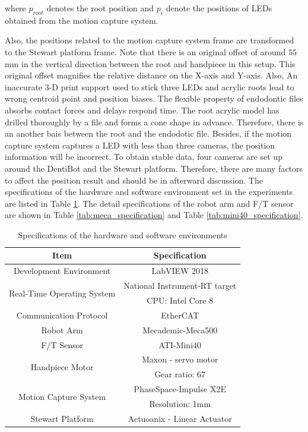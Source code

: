 where $p_{root}$ denotes the root position and $p_{i}$ denote the positions of LEDs obtained from the motion capture system. 
\par
Also, the positions related to the motion capture system frame are transformed to the Stewart platform frame. Note that there is an original offset of around $55$ mm in the vertical direction between the root and handpiece in this setup. This original offset magnifies the relative distance on the X-axis and Y-axis. Also, An inaccurate 3-D print support used to stick three LEDs and acrylic roots lead to wrong centroid point and position biases. The flexible property of endodontic files absorbs contact forces and delays respond time. The root acrylic model has drilled thoroughly by a file and forms a cone shape in advance. Therefore, there is an another bais between the root and the endodotic file. Besides, if the motion capture system captures a LED with less than three cameras, the position information will be incorrect. To obtain stable data, four cameras are set up around the DentiBot and the Stewart platform. Therefore, there are many factors to affect the position result and should be in afterward discussion.
\newpage
The specifications of the hardware and software environment set in the experiments are listed in Table \ref{tab:exp_specification}. The detail specifications of the robot arm and F/T sensor are shown in Table \ref{tab:meca_specification} and Table \ref{tab:mini40_specification}.

\begin{table}[htbp]
\centering
\tabcolsep=20pt
\arrayrulewidth=1pt
\caption{Specifications of the hardware and software environments}
\label{tab:exp_specification}
\par
\begin{tabular}{|c|c|} 
\hline
\rowcolor{lightgray!40}Item						&Specification				\\	\hline
Development Environment							&LabVIEW 2018					\\	\hline
\multirow{2}{*}{Real-Time Operating System}		&National Instrument-RT target	\\
												&CPU: Intel Core 8				\\	\hline
Communication Protocol							&EtherCAT						\\	\hline
Robot Arm										&Mecademic-Meca500				\\	\hline
F/T Sensor										&ATI-Mini40						\\	\hline
\multirow{2}{*}{Handpiece Motor}							&Maxon - servo motor				\\
												&Gear ratio: 67					\\	\hline
\multirow{2}{*}{Motion Capture System}			&PhaseSpace-Impulse X2E 		\\
												&Resolution: 1mm				\\	\hline
Stewart Platform								&Actuoanix - Linear Actuator				\\	
\hline
\end{tabular}
\end{table}

